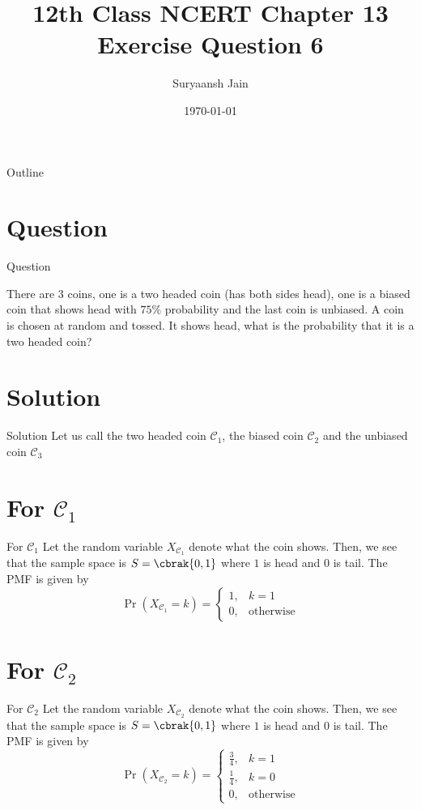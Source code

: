 \documentclass{beamer}
\title{12th Class NCERT Chapter 13 Exercise Question 6}
\author{Suryaansh Jain}
\date{\today}
\providecommand{\pr}[1]{\ensuremath{\Pr\left(#1\right)}}
\begin{document}
\begin{frame}
    \titlepage 
\end{frame}

\logo{}


\begin{frame}{Outline}
    \tableofcontents
\end{frame}


\section{Question}
\begin{frame}{Question}

There are 3 coins, one is a two headed coin (has both sides head), one is a biased coin that shows head with $75\%$ probability and the last coin is unbiased. A coin is chosen at random and tossed. It shows head, what is the probability that it is a two headed coin?
\end{frame}


\section{Solution}
\begin{frame}{Solution}
Let us call the two headed coin $\mathcal{C}_1$, the biased coin $\mathcal{C}_2$ and the unbiased coin $\mathcal{C}_3$
\end{frame} 

\section{For $\mathcal{C}_1$}
\begin{frame}{For $\mathcal{C}_1$}
Let the random variable $X_{\mathcal{C}_1}$ denote what the coin shows. Then, we see that the sample space is $S = \cbrak{0, 1}$ where $1$ is head and $0$ is tail. The PMF is given by
\begin{equation}
\pr{X_{\mathcal{C}_1} = k} = 
\begin{cases}
1, & k = 1 \\
0, & \text{otherwise} 
\end{cases}
\label{pmf}
\end{equation}
\end{frame} 

\section{For $\mathcal{C}_2$}
\begin{frame}{For $\mathcal{C}_2$}
Let the random variable $X_{\mathcal{C}_2}$ denote what the coin shows. Then, we see that the sample space is $S = \cbrak{0, 1}$ where $1$ is head and $0$ is tail. The PMF is given by
\begin{equation}
\pr{X_{\mathcal{C}_2} = k} = 
\begin{cases}
\frac{3}{4}, & k = 1 \\
\frac{1}{4}, & k = 0 \\
0, & \text{otherwise}
\end{cases}
\label{pmf}
\end{equation}
\end{frame} 
\end{document}
